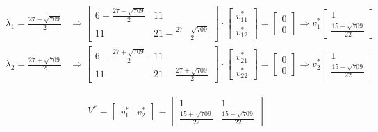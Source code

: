 \documentclass[a4paper, spanish]{article}
\begin{document}
  \begin{align}
    \lambda_1 = \frac{27 - \sqrt{709}}{2} &\Rightarrow
    \begin{bmatrix}
      6 - \frac{27 - \sqrt{709}}{2} & 11\\
      11 & 21 - \frac{27 - \sqrt{709}}{2}
    \end{bmatrix}
    \cdot
    \begin{bmatrix}
      v_{11}^* \\
      v_{12}^*
    \end{bmatrix}
    =
    \begin{bmatrix}
      0 \\
      0
    \end{bmatrix}
    \Rightarrow
    v_1^*
    \begin{bmatrix}
      1 \\
      \frac{15 + \sqrt{709}}{22}
    \end{bmatrix} \\
    \lambda_2 = \frac{27 + \sqrt{709}}{2} &\Rightarrow
    \begin{bmatrix}
      6 - \frac{27 + \sqrt{709}}{2} & 11\\
      11 & 21 - \frac{27 + \sqrt{709}}{2}
    \end{bmatrix}
    \cdot
    \begin{bmatrix}
      v_{21}^* \\
      v_{22}^*
    \end{bmatrix}
    =
    \begin{bmatrix}
      0 \\
      0
    \end{bmatrix}
    \Rightarrow
    v_2^*
    \begin{bmatrix}
      1 \\
      \frac{15 - \sqrt{709}}{22}
    \end{bmatrix}
  \end{align}


  \begin{align}
    V^* =
    \begin{bmatrix}
      v_1^* & v_2^*
    \end{bmatrix} =
    \begin{bmatrix}
      1 & 1 \\
      \frac{15 + \sqrt{709}}{22}  & \frac{15 - \sqrt{709}}{22}
    \end{bmatrix}
  \end{align}
\end{document}
